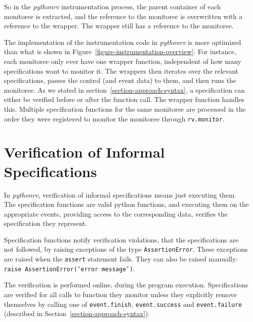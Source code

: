
So in the \textit{pythonrv} instrumentation process, the parent container of
each monitoree is extracted, and the reference to the monitoree is overwritten
with a reference to the wrapper. The wrapper still has a reference to the
monitoree.

The implementation of the instrumentation code in \textit{pythonrv} is more
optimized than what is shown in Figure~\ref{figure-instrumentation-overview}.
For instance, each monitoree only ever have one wrapper function, independent
of how many specifications want to monitor it. The wrappers then iterates over
the relevant specifications, passes the control (and event data) to them, and
then runs the monitoree. As we stated in section~\ref{section-approach-syntax},
a specification can either be verified before or after the function call. The
wrapper function handles this. Multiple specification functions for the same
monitoree are processed in the order they were registered to monitor the
monitoree through \texttt{rv.monitor}.



\section{Verification of Informal Specifications}
\label{section-approach-verification}

In \textit{pythonrv}, verification of informal specifications means just
executing them. The specification functions are valid python functions, and
executing them on the appropriate events, providing access to the corresponding
data, verifies the specification they represent.

Specification functions notify verification violations, that the specifications
are not followed, by raising exceptions of the type \texttt{AssertionError}.
These exceptions are raised when the \texttt{assert} statement fails. They can
also be raised manually: \texttt{raise AssertionError('error message')}.

The verification is performed online, during the program execution.
Specifications are verified for all calls to function they monitor unless they
explicitly remove themselves by calling one of \texttt{event.finish},
\texttt{event.success} and \texttt{event.failure} (described in
Section~\ref{section-approach-syntax}).

